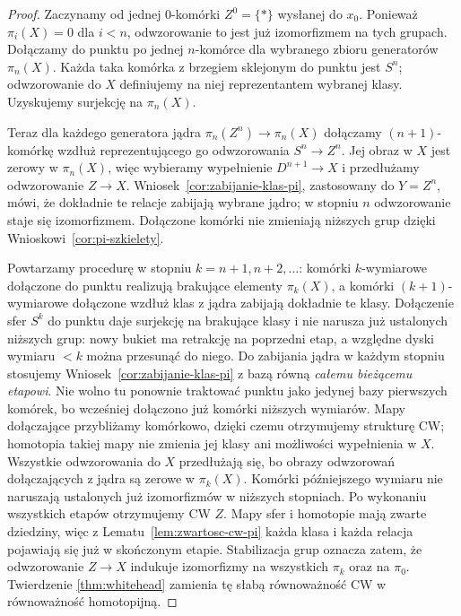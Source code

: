 \begin{proof}
Zaczynamy od jednej
$0$-komórki $Z^0=\{*\}$
wysłanej do $x_0$.
Ponieważ $\pi_i(X)=0$
dla $i<n$, odwzorowanie to
jest już izomorfizmem
na tych grupach.
Dołączamy do punktu
po jednej $n$-komórce
dla wybranego zbioru
generatorów $\pi_n(X)$.
Każda taka komórka
z brzegiem sklejonym
do punktu jest $S^n$;
odwzorowanie do $X$ definiujemy
na niej reprezentantem
wybranej klasy.
Uzyskujemy surjekcję
na $\pi_n(X)$.

Teraz dla każdego
generatora jądra
$\pi_n(Z^n)\to\pi_n(X)$
dołączamy $(n+1)$-komórkę
wzdłuż reprezentującego
go odwzorowania $S^n\to Z^n$.
Jej obraz w $X$
jest zerowy w $\pi_n(X)$,
więc wybieramy
wypełnienie $D^{n+1}\to X$
i przedłużamy odwzorowanie
$Z\to X$.
Wniosek~\ref{cor:zabijanie-klas-pi}, zastosowany do $Y=Z^n$,
mówi, że dokładnie te relacje zabijają wybrane jądro; w
stopniu $n$ odwzorowanie
staje się izomorfizmem.
Dołączone komórki
nie zmieniają niższych
grup dzięki
Wnioskowi~\ref{cor:pi-szkielety}.

Powtarzamy procedurę
w stopniu $k=n+1,n+2,\ldots$:
komórki $k$-wymiarowe
dołączone do punktu
realizują brakujące
elementy $\pi_k(X)$,
a komórki $(k+1)$-wymiarowe
dołączone wzdłuż klas
z jądra zabijają
dokładnie te klasy.
Dołączenie sfer $S^k$ do punktu daje surjekcję na brakujące klasy
i nie narusza już ustalonych niższych grup: nowy bukiet ma retrakcję
na poprzedni etap, a względne dyski wymiaru $<k$ można przesunąć do niego.
Do zabijania jądra w każdym stopniu stosujemy
Wniosek~\ref{cor:zabijanie-klas-pi} z bazą równą \emph{całemu bieżącemu etapowi}.
Nie wolno tu ponownie traktować punktu jako jedynej bazy pierwszych komórek,
bo wcześniej dołączono już komórki niższych wymiarów.
Mapy dołączające przybliżamy komórkowo, dzięki czemu otrzymujemy strukturę CW;
homotopia takiej mapy nie zmienia jej klasy ani możliwości wypełnienia w $X$.
Wszystkie odwzorowania do $X$ przedłużają się,
bo obrazy odwzorowań
dołączających z jądra
są zerowe w $\pi_k(X)$.
Komórki późniejszego
wymiaru nie naruszają
ustalonych już
izomorfizmów w
niższych stopniach.
Po wykonaniu
wszystkich etapów otrzymujemy CW $Z$.
Mapy sfer i homotopie mają zwarte dziedziny, więc z Lematu~\ref{lem:zwartosc-cw-pi}
każda klasa i każda relacja pojawiają się już w skończonym etapie.
Stabilizacja grup oznacza zatem, że odwzorowanie $Z\to X$
indukuje izomorfizmy
na wszystkich
$\pi_k$ oraz na
$\pi_0$. Twierdzenie
\ref{thm:whitehead}
zamienia tę słabą
równoważność CW
w równoważność
homotopijną.
\end{proof}


